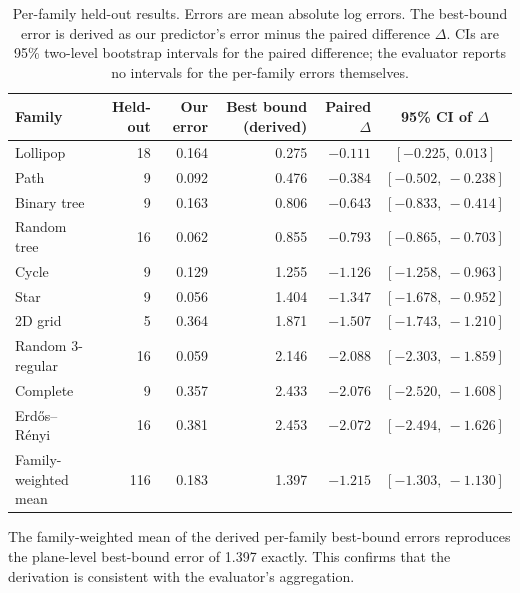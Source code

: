 \documentclass{article}
\begin{document}
\begin{table}[h]
\centering
\caption{Per-family held-out results. Errors are mean absolute log errors. The best-bound error is derived as our predictor's error minus the paired difference $\Delta$. CIs are 95\% two-level bootstrap intervals for the paired difference; the evaluator reports no intervals for the per-family errors themselves.}
\label{tab:family}
\small
\begin{tabular}{lrrrrc}
\toprule
Family & Held-out & Our error & Best bound (derived) & Paired $\Delta$ & 95\% CI of $\Delta$ \\
\midrule
Lollipop & 18 & 0.164 & 0.275 & $-0.111$ & $[-0.225,\ 0.013]$ \\
Path & 9 & 0.092 & 0.476 & $-0.384$ & $[-0.502,\ -0.238]$ \\
Binary tree & 9 & 0.163 & 0.806 & $-0.643$ & $[-0.833,\ -0.414]$ \\
Random tree & 16 & 0.062 & 0.855 & $-0.793$ & $[-0.865,\ -0.703]$ \\
Cycle & 9 & 0.129 & 1.255 & $-1.126$ & $[-1.258,\ -0.963]$ \\
Star & 9 & 0.056 & 1.404 & $-1.347$ & $[-1.678,\ -0.952]$ \\
2D grid & 5 & 0.364 & 1.871 & $-1.507$ & $[-1.743,\ -1.210]$ \\
Random 3-regular & 16 & 0.059 & 2.146 & $-2.088$ & $[-2.303,\ -1.859]$ \\
Complete & 9 & 0.357 & 2.433 & $-2.076$ & $[-2.520,\ -1.608]$ \\
Erd\H{o}s--R\'enyi & 16 & 0.381 & 2.453 & $-2.072$ & $[-2.494,\ -1.626]$ \\
\midrule
Family-weighted mean & 116 & 0.183 & 1.397 & $-1.215$ & $[-1.303,\ -1.130]$ \\
\bottomrule
\end{tabular}
\end{table}

The family-weighted mean of the derived per-family best-bound errors reproduces the plane-level best-bound error of 1.397 exactly. This confirms that the derivation is consistent with the evaluator's aggregation. %
\end{document}
